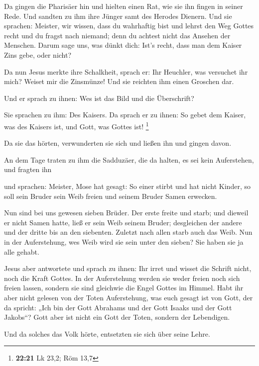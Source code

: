  Da gingen die Pharisäer hin und hielten einen Rat, wie sie
ihn fingen in seiner Rede.  Und sandten zu ihm ihre Jünger
samt des Herodes Dienern. Und sie sprachen: Meister, wir wissen, dass du
wahrhaftig bist und lehrst den Weg Gottes recht und du fragst nach
niemand; denn du achtest nicht das Ansehen der Menschen. 
Darum sage uns, was dünkt dich: Ist's recht, dass man dem Kaiser Zins
gebe, oder nicht?

 Da nun Jesus merkte ihre Schalkheit, sprach er: Ihr
Heuchler, was versuchet ihr mich?  Weiset mir die
Zinsmünze! Und sie reichten ihm einen Groschen dar.

 Und er sprach zu ihnen: Wes ist das Bild und die
Überschrift?

 Sie sprachen zu ihm: Des Kaisers. Da sprach er zu ihnen:
So gebet dem Kaiser, was des Kaisers ist, und Gott, was Gottes ist!
\footnote{\textbf{22:21} Lk 23,2; Röm 13,7}

 Da sie das hörten, verwunderten sie sich und ließen ihn
und gingen davon.

 An dem Tage traten zu ihm die Sadduzäer, die da halten, es
sei kein Auferstehen, und fragten ihn

 und sprachen: Meister, Mose hat gesagt: So einer stirbt
und hat nicht Kinder, so soll sein Bruder sein Weib freien und seinem
Bruder Samen erwecken.

 Nun sind bei uns gewesen sieben Brüder. Der erste freite
und starb; und dieweil er nicht Samen hatte, ließ er sein Weib seinem
Bruder;  desgleichen der andere und der dritte bis an den
siebenten.  Zuletzt nach allen starb auch das Weib.
 Nun in der Auferstehung, wes Weib wird sie sein unter den
sieben? Sie haben sie ja alle gehabt.

 Jesus aber antwortete und sprach zu ihnen: Ihr irret und
wisset die Schrift nicht, noch die Kraft Gottes.  In der
Auferstehung werden sie weder freien noch sich freien lassen, sondern
sie sind gleichwie die Engel Gottes im Himmel.  Habt ihr
aber nicht gelesen von der Toten Auferstehung, was euch gesagt ist von
Gott, der da spricht:  „Ich bin der Gott Abrahams und der
Gott Isaaks und der Gott Jakobs``? Gott aber ist nicht ein Gott der
Toten, sondern der Lebendigen.

 Und da solches das Volk hörte, entsetzten sie sich über
seine Lehre.

